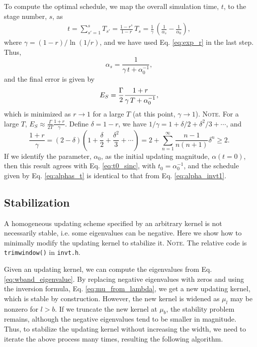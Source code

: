 \documentclass[reprint, floatfix]{revtex4-1}
\newcommand{\note}[1]{{\color{DarkGreen}\footnotesize \textsc{Note.} #1}}
\begin{document}
To compute the optimal schedule,
we map the overall simulation time, $t$,
to the stage number, $s$, as
%
\begin{align*}
  t
  = \sum_{s' = 1}^s T_{s'}
  = \frac{ 1 - r^s } { 1 - r } \, T_s
  = \frac{ 1 } { \gamma } \,
  \left(
    \frac{1}{\alpha_s}
    -
    \frac{1}{\alpha_0}
  \right)
  ,
\end{align*}
where
$\gamma = ( 1 - r ) / \ln(1/r)$,
and we have used Eq. \eqref{eq:exp_r} in the last step.
%
Thus,
%
\begin{equation}
  \alpha_s =
  \frac{ 1 }
  { \gamma \, t + \alpha_0^{-1} }
  ,
  \label{eq:alphas_t}
\end{equation}
%
and the final error is given by
%
\begin{align}
  E_S
  =
  \frac{\Gamma}{2}
  \frac{ 1 + r }
  { \gamma \, T + \alpha_0^{-1} }
  ,
  \notag
\end{align}
%
which is minimized as $r \to 1$
for a large $T$
(at this point, $\gamma \to 1$).
%
\note{
  For a large $T$, $E_S \approx \frac{\Gamma}{2T} \frac{1+r}{\gamma}$.
  Define $\delta = 1 - r$,
  we have $1/\gamma = 1+ \delta/2 + \delta^2/3 + \cdots$,
  and
  $$
  \frac{1+r}{\gamma}
  =
  (2 - \delta)
  \left(
  1 + \frac{\delta}{2} + \frac{\delta^2}{3} + \cdots
  \right)
  =
  2 + \sum_{n=1}^\infty \frac{n-1}{n(n+1)}\delta^n \ge 2
  .
  $$
}
%
If we identify the parameter, $\alpha_0$,
as the initial updating magnitude, $\alpha(t = 0)$,
then this result agrees with Eq. \eqref{eq:t0_sinc},
with $t_0 = \alpha_0^{-1}$,
and the schedule given by Eq. \eqref{eq:alphas_t}
is identical to that from Eq. \eqref{eq:alpha_invt1}.



\subsection{\label{sec:stabilize_wband}
Stabilization}



%
A homogeneous updating scheme
specified by an arbitrary kernel
is not necessarily stable,
i.e. some eigenvalues can be negative.
%
Here we show how to minimally modify
the updating kernel
to stabilize it.
%
\note{The relative code is \texttt{trimwindow()} in \texttt{invt.h}.
}


Given an updating kernel,
we can compute the eigenvalues from
Eq. \eqref{eq:wband_eigenvalue}.
%
By replacing negative eigenvalues with zeros and
using the inversion formula,
Eq. \eqref{eq:mu_from_lambda},
we get a new updating kernel,
which is stable by construction.
%
However, the new kernel is widened
as $\mu_l$ may be nonzero for $l > b$.
%
If we truncate the new kernel at $\mu_b$,
the stability problem remains,
although the negative eigenvalues
tend to be smaller in magnitude.
%
Thus, to stabilize the updating kernel
without increasing the width,
we need to iterate the above process many times,
resulting the following algorithm.
\end{document}
